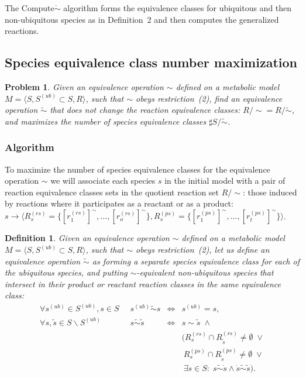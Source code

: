 \documentclass[10pt]{bmc_article}
\newenvironment{bmcformat}{\baselineskip20pt\sloppy\setboolean{publ}{false}}{\baselineskip20pt\sloppy}
\begin{document}
\begin{bmcformat}
The Compute$\mathring{\sim}$ algorithm forms the equivalence classes for ubiquitous and then non-ubiquitous species as in Definition~2 and then computes the generalized reactions.

\subsection*{Species equivalence class number maximization}
\newtheorem{p1}[pbm]{Problem}
\begin{p1}
Given an equivalence operation $\sim$ defined on a metabolic model $M=\langle S, S^{(ub)}\subset{S}, R \rangle$, such that $\sim$ obeys restriction~(2), find an equivalence operation $\tilde{\sim}$ that does not change the reaction equivalence classes: $R/\sim = R/\tilde{\sim}$, and maximizes the number of species equivalence classes $\sharp S/\tilde{\sim}$. 
\end{p1}
\subsubsection*{Algorithm}
To maximize the number of species equivalence classes for the equivalence operation $\sim$ we will associate each species $s$ in the initial model with a pair of reaction equivalence classes sets in the quotient reaction set $R/{\sim}$: those induced by reactions where it participates as a reactant or as a product: \\
$s \rightarrow \langle R^{(rs)}_s = \{[r^{(rs)}_1]^{\sim}, \ldots, [r^{(rs)}_o]^{\sim}\}, R^{(ps)}_s = \{[r^{(ps)}_1]^{\sim}, \ldots, [r^{(ps)}_t]^{\sim}\}\rangle$.

\newtheorem{eq1}[def]{Definition}\label{equiv1}
\begin{eq1}
Given an equivalence operation $\sim$ defined on a metabolic model $M=\langle S, S^{(ub)}\subset{S}, R \rangle$, such that $\sim$ obeys restriction~(2), let us define an \emph{equivalence operation $\tilde{\sim}$} as forming a separate species equivalence class for each of the ubiquitous species, and putting $\sim$-equivalent non-ubiquitous species that intersect in their product or reactant reaction classes in the same equivalence class:
\[ \begin{array}{ccll}
\mbox{$\forall s^{(ub)} \in S^{(ub)}, s \in S \;\;$} & \mbox{$s^{(ub)} \tilde{\sim} s$} & \mbox{$\iff$} & \mbox{$s^{(ub)} = s$}, \\
\mbox{$\forall s, \tilde{s} \in S \backslash S^{(ub)} \;$} & \mbox{$s \tilde{\sim} \tilde{s}$} & \mbox{$\iff $} & \mbox{$s \sim \tilde{s}\;\land$} \\
& & &(\mbox{$R^{(rs)}_s \cap R^{(rs)}_{\tilde{s}} \neq \emptyset\;\lor$} \\
& & &~\mbox{$R^{(ps)}_s \cap R^{(ps)}_{\tilde{s}} \neq \emptyset\;\lor$} \\
& & &~\mbox{$\exists \dot{s} \in S:\; s \tilde{\sim} \dot{s} \land \dot{s} \tilde{\sim} \tilde{s})$}.
\end{array} \]
\end{eq1}


\end{bmcformat}
\end{document}
